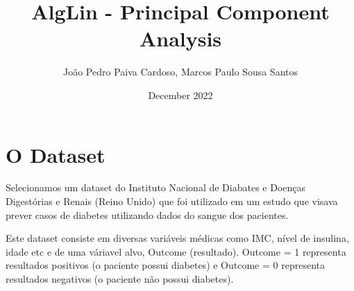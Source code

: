 \documentclass{article}
\title{AlgLin - Principal Component Analysis}
\author{João Pedro Paiva Cardoso, Marcos Paulo Sousa Santos}
\date{December 2022}
\begin{document}
\maketitle

\section{O Dataset}
\par
Selecionamos um dataset do Instituto Nacional de Diabates e Doenças Digestórias e Renais (Reino Unido) que foi utilizado em um estudo que visava prever casos de diabetes utilizando dados do sangue dos pacientes.\par 
Este dataset consiste em diversas variáveis médicas como IMC, nível de insulina, idade etc e de uma váriavel alvo, Outcome (resultado). Outcome = 1 representa resultados positivos (o paciente possui diabetes) e Outcome = 0 representa resultados negativos (o paciente não possui diabetes).
\end{document}
